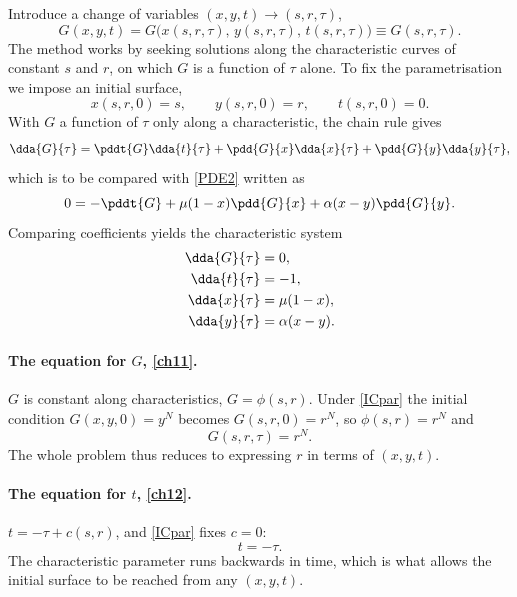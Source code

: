 Introduce a change of variables $(x,y,t)\to(s,r,\tau)$,
\begin{equation*}
G(x,y,t) = G\bigl(x(s,r,\tau),\,y(s,r,\tau),\,t(s,r,\tau)\bigr) \equiv G(s,r,\tau).
\end{equation*}
The method works by seeking solutions along the characteristic curves of constant $s$
and $r$, on which $G$ is a function of $\tau$ alone. To fix the parametrisation we
impose an initial surface,
\begin{equation}
\label{ICpar}
x(s,r,0) = s, \qquad y(s,r,0) = r, \qquad t(s,r,0) = 0 .
\end{equation}
With $G$ a function of $\tau$ only along a characteristic, the chain rule gives
\begin{equation*}
\dda{G}{\tau} = \pddt{G}\dda{t}{\tau} + \pdd{G}{x}\dda{x}{\tau} + \pdd{G}{y}\dda{y}{\tau},
\end{equation*}
which is to be compared with \cref{PDE2} written as
\begin{equation*}
0 = -\pddt{G} + \mu(1-x)\pdd{G}{x} + \alpha(x-y)\pdd{G}{y} .
\end{equation*}
Comparing coefficients yields the characteristic system
\begin{align}
\dda{G}{\tau} &= 0, \label{ch11}\\
\dda{t}{\tau} &= -1, \label{ch12}\\
\dda{x}{\tau} &= \mu(1-x), \label{ch13}\\
\dda{y}{\tau} &= \alpha(x-y). \label{ch14}
\end{align}

\paragraph{The equation for $G$, \eqref{ch11}.}
$G$ is constant along characteristics, $G = \phi(s,r)$. Under \cref{ICpar} the initial
condition $G(x,y,0)=y^N$ becomes $G(s,r,0)=r^N$, so $\phi(s,r)=r^N$ and
\begin{equation}
\label{GrN}
G(s,r,\tau) = r^N .
\end{equation}
The whole problem thus reduces to expressing $r$ in terms of $(x,y,t)$.

\paragraph{The equation for $t$, \eqref{ch12}.}
$t = -\tau + c(s,r)$, and \cref{ICpar} fixes $c=0$:
\begin{equation}
\label{minustau}
t = -\tau .
\end{equation}
The characteristic parameter runs backwards in time, which is what allows the initial
surface to be reached from any $(x,y,t)$.

